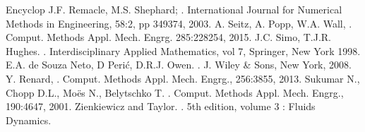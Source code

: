 \documentclass[a4paper,11pt,english]{sphinxmanual}
\begin{document}
\begin{sphinxthebibliography}{Encyclop}
J.\sphinxhyphen{}F. Remacle, M.S. Shephard;
. International Journal for Numerical Methods in Engineering, 58:2, pp 349\sphinxhyphen{}374, 2003.
A. Seitz, A. Popp, W.A. Wall,
. Comput. Methods Appl. Mech. Engrg. 285:228\sphinxhyphen{}254, 2015.
J.C. Simo, T.J.R. Hughes.
. Interdisciplinary Applied Mathematics, vol 7, Springer, New York 1998.
E.A. de Souza Neto, D Perić, D.R.J. Owen.
. J. Wiley \& Sons, New York, 2008.
Y. Renard,
.  Comput. Methods Appl. Mech. Engrg., 256:38\sphinxhyphen{}55, 2013.
Sukumar N., Chopp D.L., Moës N., Belytschko T.
. Comput. Methods Appl. Mech. Engrg., 190:46\sphinxhyphen{}47, 2001.
Zienkiewicz and Taylor. . 5th edition,
volume 3 : Fluids Dynamics.
\end{sphinxthebibliography}



\renewcommand{\indexname}{Index}
\printindex
\end{document}
